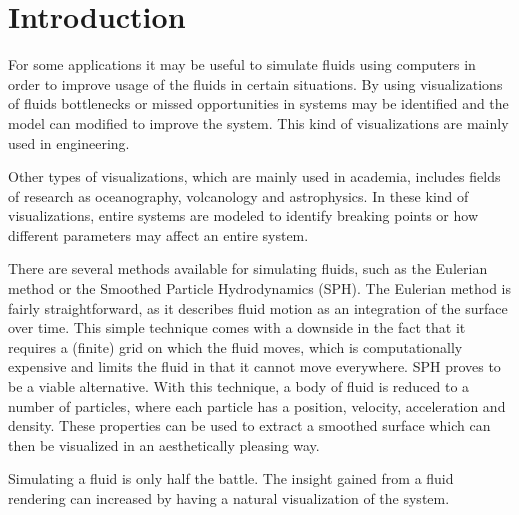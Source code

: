 \section{Introduction}

For some applications it may be useful to simulate fluids using computers in order to improve usage of the fluids in certain situations.
By using visualizations of fluids bottlenecks or missed opportunities in systems may be identified and the model can modified to improve the system.
This kind of visualizations are mainly used in engineering.

Other types of visualizations, which are mainly used in academia, includes fields of research as oceanography, volcanology and astrophysics. 
In these kind of visualizations, entire systems are modeled to identify breaking points or how different parameters may affect an entire system.

There are several methods available for simulating fluids, such as the Eulerian method or the Smoothed Particle Hydrodynamics (SPH). The Eulerian method is fairly straightforward, as it describes fluid motion as an integration of the surface over time. 
This simple technique comes with a downside in the fact that it requires a (finite) grid on which the fluid moves, which is computationally expensive and limits the fluid in that it cannot move everywhere.
SPH proves to be a viable alternative. 
With this technique, a body of fluid is reduced to a number of particles, where each particle has a position, velocity, acceleration and density.
These properties can be used to extract a smoothed surface which can then be visualized in an aesthetically pleasing way. 	

Simulating a fluid is only half the battle. The insight gained from a fluid rendering can increased by having a natural visualization of the system. 